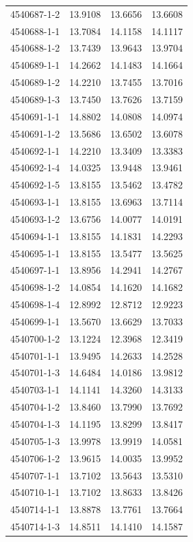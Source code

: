 \begin{longtable}{lrrr}
4540687-1-2 & 13.9108 & 13.6656 & 13.6608 \\
4540688-1-1 & 13.7084 & 14.1158 & 14.1117 \\
4540688-1-2 & 13.7439 & 13.9643 & 13.9704 \\
4540689-1-1 & 14.2662 & 14.1483 & 14.1664 \\
4540689-1-2 & 14.2210 & 13.7455 & 13.7016 \\
4540689-1-3 & 13.7450 & 13.7626 & 13.7159 \\
4540691-1-1 & 14.8802 & 14.0808 & 14.0974 \\
4540691-1-2 & 13.5686 & 13.6502 & 13.6078 \\
4540692-1-1 & 14.2210 & 13.3409 & 13.3383 \\
4540692-1-4 & 14.0325 & 13.9448 & 13.9461 \\
4540692-1-5 & 13.8155 & 13.5462 & 13.4782 \\
4540693-1-1 & 13.8155 & 13.6963 & 13.7114 \\
4540693-1-2 & 13.6756 & 14.0077 & 14.0191 \\
4540694-1-1 & 13.8155 & 14.1831 & 14.2293 \\
4540695-1-1 & 13.8155 & 13.5477 & 13.5625 \\
4540697-1-1 & 13.8956 & 14.2941 & 14.2767 \\
4540698-1-2 & 14.0854 & 14.1620 & 14.1682 \\
4540698-1-4 & 12.8992 & 12.8712 & 12.9223 \\
4540699-1-1 & 13.5670 & 13.6629 & 13.7033 \\
4540700-1-2 & 13.1224 & 12.3968 & 12.3419 \\
4540701-1-1 & 13.9495 & 14.2633 & 14.2528 \\
4540701-1-3 & 14.6484 & 14.0186 & 13.9812 \\
4540703-1-1 & 14.1141 & 14.3260 & 14.3133 \\
4540704-1-2 & 13.8460 & 13.7990 & 13.7692 \\
4540704-1-3 & 14.1195 & 13.8299 & 13.8417 \\
4540705-1-3 & 13.9978 & 13.9919 & 14.0581 \\
4540706-1-2 & 13.9615 & 14.0035 & 13.9952 \\
4540707-1-1 & 13.7102 & 13.5643 & 13.5310 \\
4540710-1-1 & 13.7102 & 13.8633 & 13.8426 \\
4540714-1-1 & 13.8878 & 13.7761 & 13.7664 \\
4540714-1-3 & 14.8511 & 14.1410 & 14.1587 \\

\end{longtable}
